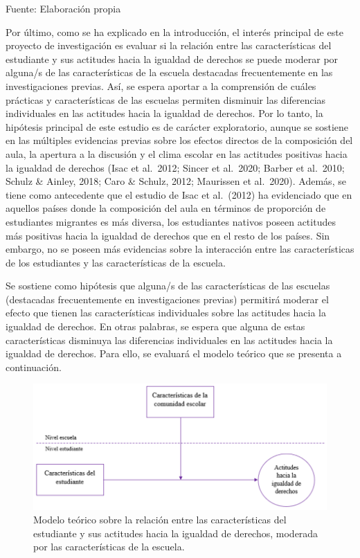 \documentclass[12pt,twoside]{templates/facsothesis}
\begin{document}
\begin{center}

Fuente: Elaboración propia 

\end{center}

Por último, como se ha explicado en la introducción, el interés principal de este proyecto de investigación es evaluar si la relación entre las características del estudiante y sus actitudes hacia la igualdad de derechos se puede moderar por alguna/s de las características de la escuela destacadas frecuentemente en las investigaciones previas. Así, se espera aportar a la comprensión de cuáles prácticas y características de las escuelas permiten disminuir las diferencias individuales en las actitudes hacia la igualdad de derechos. Por lo tanto, la hipótesis principal de este estudio es de carácter exploratorio, aunque se sostiene en las múltiples evidencias previas sobre los efectos directos de la composición del aula, la apertura a la discusión y el clima escolar en las actitudes positivas hacia la igualdad de derechos (Isac et al.~2012; Sincer et al.~2020; Barber et al.~2010; Schulz \& Ainley, 2018; Caro \& Schulz, 2012; Maurissen et al.~2020). Además, se tiene como antecedente que el estudio de Isac et al.~(2012) ha evidenciado que en aquellos países donde la composición del aula en términos de proporción de estudiantes migrantes es más diversa, los estudiantes nativos poseen actitudes más positivas hacia la igualdad de derechos que en el resto de los países. Sin embargo, no se poseen más evidencias sobre la interacción entre las características de los estudiantes y las características de la escuela.

Se sostiene como hipótesis que alguna/s de las características de las escuelas (destacadas frecuentemente en investigaciones previas) permitirá moderar el efecto que tienen las características individuales sobre las actitudes hacia la igualdad de derechos. En otras palabras, se espera que alguna de estas características disminuya las diferencias individuales en las actitudes hacia la igualdad de derechos. Para ello, se evaluará el modelo teórico que se presenta a continuación.

\begin{figure}

{\centering \includegraphics[width=0.8\linewidth]{input/images/modelo_3} 

}

\caption{Modelo teórico sobre la relación entre las características del estudiante y sus actitudes hacia la igualdad de derechos, moderada por las características de la escuela.}\label{fig:unnamed-chunk-4}
\end{figure}
\end{document}
